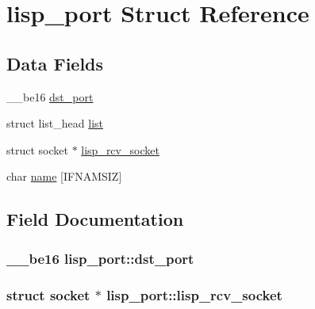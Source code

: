 \hypertarget{structlisp__port}{}\section{lisp\+\_\+port Struct Reference}
\label{structlisp__port}
\subsection*{Data Fields}
\begin{DoxyCompactItemize}
\item 
\+\_\+\+\_\+be16 \hyperlink{structlisp__port_a3f0943c0da5e5c60f9e8e4068d49215e}{dst\+\_\+port}
\item 
struct list\+\_\+head \hyperlink{structlisp__port_adaf751d0e165cfbf047be71e680c3f19}{list}
\item 
struct socket $\ast$ \hyperlink{structlisp__port_ac5fbe9815941c2930c73339250706300}{lisp\+\_\+rcv\+\_\+socket}
\item 
char \hyperlink{structlisp__port_ae0a7f15d977897e051bb338429f1d7fe}{name} \mbox{[}I\+F\+N\+A\+M\+S\+I\+Z\mbox{]}
\end{DoxyCompactItemize}


\subsection{Field Documentation}
\hypertarget{structlisp__port_a3f0943c0da5e5c60f9e8e4068d49215e}{}
\subsubsection[{dst\+\_\+port}]{\setlength{\rightskip}{0pt plus 5cm}\+\_\+\+\_\+be16 lisp\+\_\+port\+::dst\+\_\+port}\label{structlisp__port_a3f0943c0da5e5c60f9e8e4068d49215e}
\hypertarget{structlisp__port_ac5fbe9815941c2930c73339250706300}{}
\subsubsection[{lisp\+\_\+rcv\+\_\+socket}]{\setlength{\rightskip}{0pt plus 5cm}struct socket $\ast$ lisp\+\_\+port\+::lisp\+\_\+rcv\+\_\+socket}\label{structlisp__port_ac5fbe9815941c2930c73339250706300}
\hypertarget{structlisp__port_adaf751d0e165cfbf047be71e680c3f19}{}
